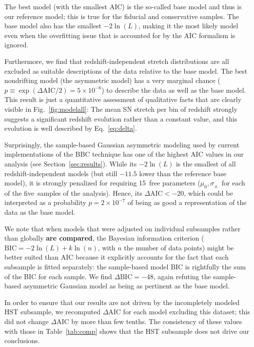 \documentclass[]{aa}
\begin{document}
The best model (with the smallest AIC) is the so-called base model and thus is
our reference model; this is true for the fiducial and conservative samples.
The base model also has the smallest $-2\ln(L)$, making it the most likely model
even when the overfitting issue that is accounted for by the AIC formalism is
ignored.

Furthermore, we find that redshift-independent stretch distributions are all
excluded as suitable descriptions of the data relative to the base model. The
best nondrifting model (the asymmetric model) has a very marginal chance ($p
\equiv \exp\left(\Delta\mathrm{AIC}/2\right) = 5\times10^{-6}$) to describe the
data as well as the base model. This result is just a quantitative assessment of
qualitative facts that are clearly visible in Fig.~\ref{fig:modelall}: The mean
SN stretch per bin of redshift strongly suggests a significant redshift
evolution rather than a constant value, and this evolution is well described by
Eq.~\ref{eq:delta}.

Surprisingly, the sample-based Gaussian asymmetric modeling used by current
implementations of the BBC technique \citep{scolnic2016, kessler2017} has one of
the highest AIC values in our analysis (see Section~\ref{sec:results}). While
its $-2\ln(L)$ is the smallest of all redshift-independent models (but still
$-11.5$ lower than the reference base model), it is strongly penalized for
requiring 15~free parameters ($\mu_0, \sigma_{\pm}$~for each of the five~samples
of the analysis). Hence, its $\Delta\mathrm{AIC}<-20$, which could be
interpreted as a probability $p=2\times 10^{-7}$ of being as good a
representation of the data as the base model.

We note that when models that were adjusted on individual subsamples rather than
globally \textbf{are compared}, the Bayesian information criterion
($\mathrm{BIC} = -2\ln(L) + k\ln(n)$, with $n$ the number of data points) might
be better suited than AIC because it explicitly accounts for the fact that each
subsample is fitted separately: the sample-based model BIC is rightfully the sum
of the BIC for each sample. We find $\Delta\mathrm{BIC}=-48$, again refuting the
sample-based asymmetric Gaussian model as being as pertinent as the base model.

In order to ensure that our results are not driven by the incompletely modeled
HST subsample, we recomputed $\Delta$AIC for each model excluding this dataset;
this did not change $\Delta$AIC by more than few tenths. The consistency of
these values with those in Table~\ref{tab:comp} shows that the HST subsample
does not drive our conclusions.
\end{document}
